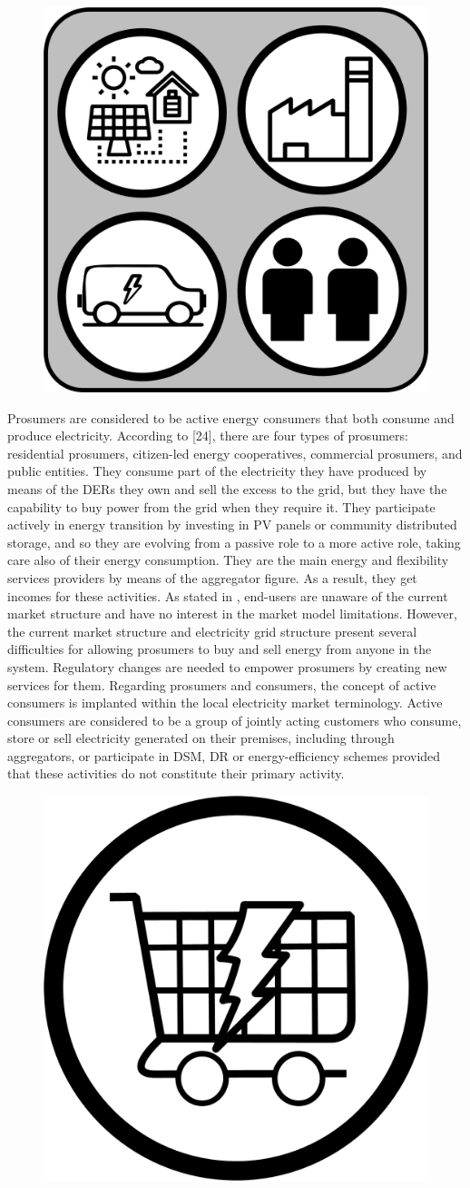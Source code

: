 \begin{figure}
	\centering
	\includegraphics[width=0.1\columnwidth ]{ChapterIntro/Figures/Prosumer.jpg}
	\label{Prosumer}  
\end{figure}

Prosumers are considered to be active energy consumers that both consume and produce electricity. According to [24], there are four types of prosumers: residential prosumers, citizen-led energy cooperatives, commercial prosumers, and public entities. They consume part of the electricity they have produced by means of the DERs they own and sell the excess to the grid, but they have the capability to buy power from the grid when they require it. They participate actively in energy transition by investing in PV panels or community distributed storage, and so they are evolving from a passive role to a more active role, taking care also of their energy consumption. They are the main energy and flexibility services providers by means of the aggregator figure. As a result, they get incomes for these activities. As stated in \cite{USEFFoundation2015a}, end-users are unaware of the current market structure and have no interest in the market model limitations. However, the current market structure and electricity grid structure present several difficulties for allowing prosumers to buy and sell energy from anyone in the system. Regulatory changes are needed to empower prosumers by creating new services for them. Regarding prosumers and consumers, the concept of active consumers is implanted within the local electricity market terminology. Active consumers are considered to be a group of jointly acting customers who consume, store or sell electricity generated on their premises, including through aggregators, or participate in DSM, DR or energy-efficiency schemes provided that these activities do not constitute their primary activity.\\

\begin{figure}
	\centering
	\includegraphics[width=0.1\columnwidth ]{ChapterIntro/Figures/ElectricityMarket.jpg}
	\label{Electricity Market}  
\end{figure}


